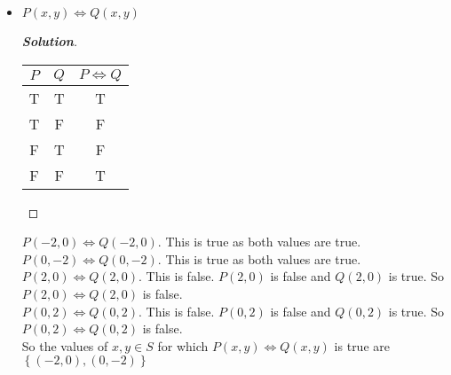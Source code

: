 \documentclass[11pt]{article}
\newenvironment{problem}[2][Problem\!]{\begin{trivlist}
\item[\hskip \labelsep {\bfseries #1}\hskip \labelsep {\bfseries #2.}]}{\end{trivlist}}
\newenvironment{solution}{\begin{proof}[\textbf{\textit{Solution}}]}{\end{proof}}
\newcommand{\set}[1]{\left\{#1\right\}} %
\begin{document}
\begin{problem}{2.2}
\begin{itemize}[itemsep=3em]
\item[(f)] $P(x,y) \iff Q(x,y)$
\begin{solution}
\begin{center}
\begin{tabular}{|c|c|c|}
\hline
$P$ & $Q$ & $P \iff Q$ \\
\hline
T & T & T \\
T & F & F \\
F & T & F \\
F & F & T \\
\hline
\end{tabular}
\end{center}
\end{solution}
\(P(-2,0) \iff Q(-2,0)\). This is true as both values are true. \\
\(P(0,-2) \iff Q(0,-2)\). This is true as both values are true. \\
\(P(2,0) \iff Q(2,0)\). This is false. \(P(2,0)\) is false and \(Q(2,0)\) is true. So \(P(2,0) \iff Q(2,0)\) is false. \\ 
\(P(0,2) \iff Q(0,2)\). This is false. \(P(0,2)\) is false and \(Q(0,2)\) is true. So \(P(0,2) \iff Q(0,2)\) is false. \\ 
So the values of \(x,y \in S\) for which \(P(x,y) \iff Q(x,y)\) is true are \(\set{(-2,0),(0,-2)}\)
\end{itemize}
\end{problem}

\newpage  %
\end{document}
